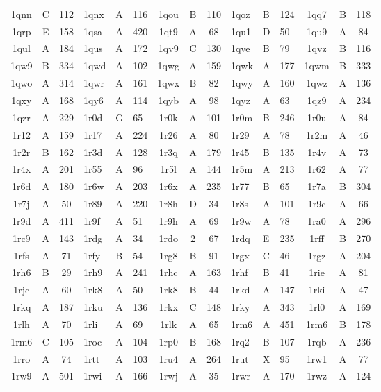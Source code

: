 \begin{longtable}{|c|c|c| a|a|a| c|c|c| a|a|a| c|c|c|}
1qnn & C & 112 & 1qnx & A & 116 & 1qou & B & 110 & 1qoz & B & 124 & 1qq7 & B & 118\\
1qrp & E & 158 & 1qsa & A & 420 & 1qt9 & A & 68 & 1qu1 & D & 50 & 1qu9 & A & 84\\
1qul & A & 184 & 1qus & A & 172 & 1qv9 & C & 130 & 1qve & B & 79 & 1qvz & B & 116\\
1qw9 & B & 334 & 1qwd & A & 102 & 1qwg & A & 159 & 1qwk & A & 177 & 1qwm & B & 333\\
1qwo & A & 314 & 1qwr & A & 161 & 1qwx & B & 82 & 1qwy & A & 160 & 1qwz & A & 136\\
1qxy & A & 168 & 1qy6 & A & 114 & 1qyb & A & 98 & 1qyz & A & 63 & 1qz9 & A & 234\\
1qzr & A & 229 & 1r0d & G & 65 & 1r0k & A & 101 & 1r0m & B & 246 & 1r0u & A & 84\\
1r12 & A & 159 & 1r17 & A & 224 & 1r26 & A & 80 & 1r29 & A & 78 & 1r2m & A & 46\\
1r2r & B & 162 & 1r3d & A & 128 & 1r3q & A & 179 & 1r45 & B & 135 & 1r4v & A & 73\\
1r4x & A & 201 & 1r55 & A & 96 & 1r5l & A & 144 & 1r5m & A & 213 & 1r62 & A & 77\\
1r6d & A & 180 & 1r6w & A & 203 & 1r6x & A & 235 & 1r77 & B & 65 & 1r7a & B & 304\\
1r7j & A & 50 & 1r89 & A & 220 & 1r8h & D & 34 & 1r8s & A & 101 & 1r9c & A & 66\\
1r9d & A & 411 & 1r9f & A & 51 & 1r9h & A & 69 & 1r9w & A & 78 & 1ra0 & A & 296\\
1rc9 & A & 143 & 1rdg & A & 34 & 1rdo & 2 & 67 & 1rdq & E & 235 & 1rff & B & 270\\
1rfs & A & 71 & 1rfy & B & 54 & 1rg8 & B & 91 & 1rgx & C & 46 & 1rgz & A & 204\\
1rh6 & B & 29 & 1rh9 & A & 241 & 1rhc & A & 163 & 1rhf & B & 41 & 1rie & A & 81\\
1rjc & A & 60 & 1rk8 & A & 50 & 1rk8 & B & 44 & 1rkd & A & 147 & 1rki & A & 47\\
1rkq & A & 187 & 1rku & A & 136 & 1rkx & C & 148 & 1rky & A & 343 & 1rl0 & A & 169\\
1rlh & A & 70 & 1rli & A & 69 & 1rlk & A & 65 & 1rm6 & A & 451 & 1rm6 & B & 178\\
1rm6 & C & 105 & 1roc & A & 104 & 1rp0 & B & 168 & 1rq2 & B & 107 & 1rqb & A & 236\\
1rro & A & 74 & 1rtt & A & 103 & 1ru4 & A & 264 & 1rut & X & 95 & 1rw1 & A & 77\\
1rw9 & A & 501 & 1rwi & A & 166 & 1rwj & A & 35 & 1rwr & A & 170 & 1rwz & A & 124\\

\end{longtable}
